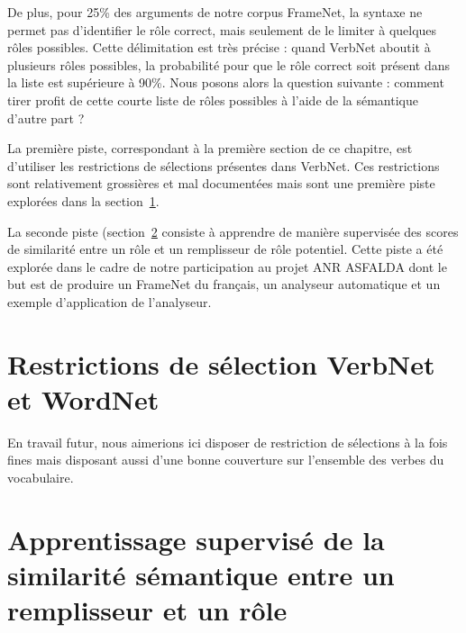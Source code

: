 De plus, pour 25\% des arguments de notre corpus FrameNet, la syntaxe ne permet
pas d'identifier le rôle correct, mais seulement de le limiter à quelques rôles
possibles. Cette délimitation est très précise : quand VerbNet aboutit à
plusieurs rôles possibles, la probabilité pour que le rôle correct soit présent
dans la liste est supérieure à 90\%. Nous posons alors la question suivante :
comment tirer profit de cette courte liste de rôles possibles à l'aide de la
sémantique d'autre part ?

La première piste, correspondant à la première section de ce chapitre, est
d'utiliser les restrictions de sélections présentes dans VerbNet. Ces
restrictions sont relativement grossières et mal documentées mais sont une
première piste explorées dans la section~\ref{sec:restr_verbnet}.

La seconde piste (section~\ref{sec:similarity_module} consiste à apprendre de
manière supervisée des scores de similarité entre un rôle et un remplisseur de
rôle potentiel. Cette piste a été explorée dans le cadre de notre participation
au projet ANR ASFALDA dont le but est de produire un FrameNet du français, un
analyseur automatique et un exemple d'application de l'analyseur.

\section{Restrictions de sélection VerbNet et WordNet}
\label{sec:restr_verbnet}

En travail futur, nous aimerions ici disposer de restriction de sélections à la
fois fines mais disposant aussi d'une bonne couverture sur l'ensemble des
verbes du vocabulaire.

\section{Apprentissage supervisé de la similarité sémantique entre un remplisseur et un rôle}
\label{sec:similarity_module}
